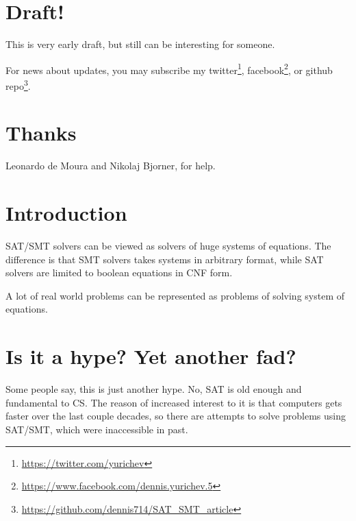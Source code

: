 
\section{Draft!}

This is very early draft, but still can be interesting for someone.

For news about updates, you may subscribe my 
twitter\footnote{\url{https://twitter.com/yurichev}}, 
facebook\footnote{\url{https://www.facebook.com/dennis.yurichev.5}}, 
or github repo\footnote{\url{https://github.com/dennis714/SAT_SMT_article}}.

\section{Thanks}

Leonardo de Moura and Nikolaj Bjorner, for help.

\section{Introduction}

\ac{SAT}/\ac{SMT} solvers can be viewed as solvers of huge systems of equations.
The difference is that \ac{SMT} solvers takes systems in arbitrary format,
while \ac{SAT} solvers are limited to boolean equations in CNF form.

A lot of real world problems can be represented as problems of solving system of equations.

\section{Is it a hype? Yet another fad?}

Some people say, this is just another hype.
No, \ac{SAT} is old enough and fundamental to \ac{CS}.
The reason of increased interest to it is that computers gets faster over the last couple decades,
so there are attempts to solve problems using \ac{SAT}/\ac{SMT}, which were inaccessible in past.

